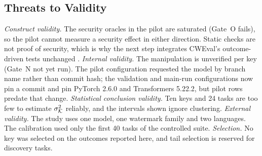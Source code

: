 \subsection{Threats to Validity}
\emph{Construct validity.} The security oracles in the pilot are saturated (Gate~O fails), so the pilot cannot measure a security effect in either direction. Static checks are not proof of security, which is why the next step integrates CWEval's outcome-driven tests unchanged \citep{peng2025cweval}. \emph{Internal validity.} The manipulation is unverified per key (Gate~N not yet run). The pilot configuration requested the model by branch name rather than commit hash; the validation and main-run configurations now pin a commit and pin PyTorch 2.6.0 and Transformers 5.22.2, but pilot rows predate that change. \emph{Statistical conclusion validity.} Ten keys and 24 tasks are too few to estimate $\sigma^2_{\mathcal{K}}$ reliably, and the intervals shown ignore clustering. \emph{External validity.} The study uses one model, one watermark family and two languages. The calibration used only the first 40 tasks of the controlled suite. \emph{Selection.} No key was selected on the outcomes reported here, and tail selection is reserved for discovery tasks.
